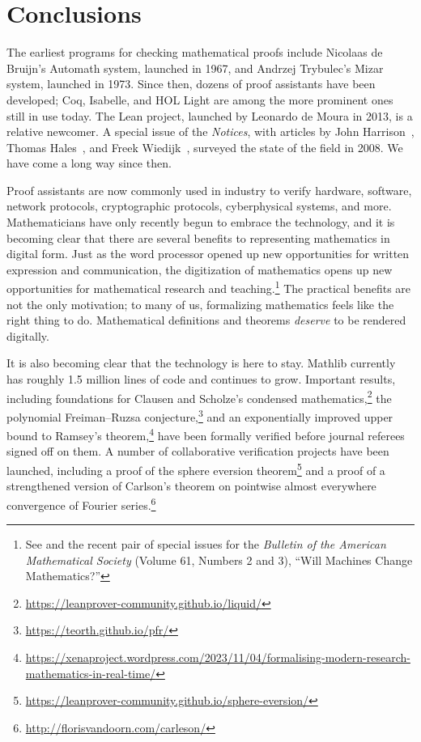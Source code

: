 \documentclass[11pt]{article}
\begin{document}
\section*{Conclusions}

The earliest programs for checking mathematical proofs include Nicolaas de Bruijn's Automath system, launched in 1967, and Andrzej Trybulec's Mizar system, launched in 1973. Since then, dozens of proof assistants have been developed; Coq, Isabelle, and HOL Light are among the more prominent ones still in use today.
The Lean project, launched by Leonardo de Moura in 2013, is a relative newcomer.
A special issue of the \emph{Notices}, with articles by John Harrison~\cite{MR2463992}, Thomas Hales~\cite{MR2463990}, and Freek Wiedijk~\cite{MR2463993}, surveyed the state of the field in 2008.
We have come a long way since then.

Proof assistants are now commonly used in industry to verify hardware, software, network protocols, cryptographic protocols, cyberphysical systems, and more.
Mathematicians have only recently begun to embrace the technology,
and it is becoming clear that there are several benefits to representing mathematics in digital form.
Just as the word processor opened up new opportunities for written expression and communication, the digitization of mathematics opens up new opportunities for mathematical research and teaching.\footnote{See \cites{massot2021formalize,MR4726989,MR4680264} and the recent pair of special issues for the \emph{Bulletin of the American Mathematical Society} (Volume 61, Numbers 2 and 3), ``Will Machines Change Mathematics?''} The practical benefits are not the only motivation; to many of us, formalizing mathematics feels like the right thing to do. Mathematical definitions and theorems \emph{deserve} to be rendered digitally.

It is also becoming clear that the technology is here to stay. Mathlib currently has roughly 1.5 million lines of code and continues to grow.
Important results, including
foundations for Clausen and Scholze's condensed mathematics,\footnote{\url{https://leanprover-community.github.io/liquid/}}
the polynomial Freiman--Ruzsa conjecture,\footnote{\url{https://teorth.github.io/pfr/}}
and an exponentially improved upper bound to Ramsey's theorem,\footnote{\url{https://xenaproject.wordpress.com/2023/11/04/formalising-modern-research-mathematics-in-real-time/}}
have been formally verified before journal referees signed off on them.
A number of collaborative verification projects have been launched,
including a proof of the sphere eversion theorem\footnote{\url{https://leanprover-community.github.io/sphere-eversion/}}
and a proof of a strengthened version of
Carlson's theorem on pointwise almost everywhere convergence of Fourier series.\footnote{\url{http://florisvandoorn.com/carleson/}}
\end{document}
